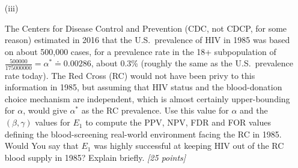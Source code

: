\documentclass[12pt]{article}
\newenvironment{solution}{\begin{proof}[\textbf{\textit{Solution}}] }{\end{proof}}
\begin{document}
\begin{itemize}
\begin{itemize}
\begin{tcolorbox}[breakable]
\begin{solution}
        Now with how FDR and FOR relate to PPV and NPV respectively. Looking at PPV and FDR we see they are complements of one another. This is because we see for calculating denominator in the FDR we have,
        \[FP + TP = \alpha\beta + (1-\alpha)(1-\gamma)\]
        which matches the denominator of the PPV. Now the reason they are complements of one another is because for the numerator of FDR we are taking the top right cell (HIV- / FP) and PPV is taking the top left cell (HIV+ / TP), but they're both over the same row total (conditioning on the same thing). In other words we can define them in terms of one another (push \& pull),
        \[PPV = 1 - FDR.\]
        By similar reasoning we have the same relation for NPV and FOR,
        \[NPV = 1 - FOR.\]


    \end{solution}
\end{tcolorbox}
\newpage
\item[(iii)]

The Centers for Disease Control and Prevention (CDC, not CDCP, for some reason) estimated in 2016 that the U.S.~prevalence of HIV in 1985 was based on about 500,000 cases, for a prevalence rate in the 18+ subpopulation of $\frac{ 500000 }{ 175000000 } = \alpha^* \doteq 0.00286$, about 0.3\% (roughly the same as the U.S.~prevalence rate today). The Red Cross (RC) would not have been privy to this information in 1985, but assuming that HIV status and the blood-donation choice mechanism are independent, which is almost certainly upper-bounding for $\alpha$, would give $\alpha^*$ as the RC prevalence. Use this value for $\alpha$ and the $( \beta, \gamma )$ values for $E_1$ to compute the PPV, NPV, FDR and FOR values defining the blood-screening real-world environment facing the RC in 1985. Would You say that $E_1$ was highly successful at keeping HIV out of the RC blood supply in 1985? Explain briefly. \textit{[25 points]}


\end{itemize}
\end{itemize}
\end{document}

